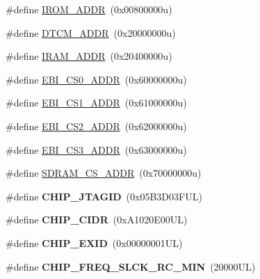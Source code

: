 \begin{DoxyCompactItemize}
\item 
\#define \mbox{\hyperlink{group__SAME70N21__definitions_ga694212ffb8c2786bacee3d0ad6020bda}{I\+R\+O\+M\+\_\+\+A\+D\+DR}}~(0x00800000u)
\item 
\#define \mbox{\hyperlink{group__SAME70N21__definitions_ga26626a425f7ebb3a0c2dbc276f0d9f78}{D\+T\+C\+M\+\_\+\+A\+D\+DR}}~(0x20000000u)
\item 
\#define \mbox{\hyperlink{group__SAME70N21__definitions_gaae45ac2ef16942159481c767ac4805cf}{I\+R\+A\+M\+\_\+\+A\+D\+DR}}~(0x20400000u)
\item 
\#define \mbox{\hyperlink{group__SAME70N21__definitions_ga9bcbb97ddae3b2cc5e2c9613d33f66b4}{E\+B\+I\+\_\+\+C\+S0\+\_\+\+A\+D\+DR}}~(0x60000000u)
\item 
\#define \mbox{\hyperlink{group__SAME70N21__definitions_gaaddd9fdbbc77c9aced5308819f502a26}{E\+B\+I\+\_\+\+C\+S1\+\_\+\+A\+D\+DR}}~(0x61000000u)
\item 
\#define \mbox{\hyperlink{group__SAME70N21__definitions_ga058a35f9991487dc2dd12ada792d0730}{E\+B\+I\+\_\+\+C\+S2\+\_\+\+A\+D\+DR}}~(0x62000000u)
\item 
\#define \mbox{\hyperlink{group__SAME70N21__definitions_gad66ebdd0fc33ec3cf85dbaa14bbf05d9}{E\+B\+I\+\_\+\+C\+S3\+\_\+\+A\+D\+DR}}~(0x63000000u)
\item 
\#define \mbox{\hyperlink{group__SAME70N21__definitions_ga61b7db25daf759c2a2beb6e5a0b57a84}{S\+D\+R\+A\+M\+\_\+\+C\+S\+\_\+\+A\+D\+DR}}~(0x70000000u)
\item 
\mbox{\label{group__SAME70N21__definitions_gaa614519778eec0df55d3eeab3223e3f6}} 
\#define {\bfseries C\+H\+I\+P\+\_\+\+J\+T\+A\+G\+ID}~(0x05\+B3\+D03\+F\+U\+L)
\item 
\mbox{\label{group__SAME70N21__definitions_ga1e1ae44dd9269a8a98c1d7e7a60e9fbd}} 
\#define {\bfseries C\+H\+I\+P\+\_\+\+C\+I\+DR}~(0x\+A1020\+E00\+U\+L)
\item 
\mbox{\label{group__SAME70N21__definitions_ga35123717aa86b76bb6b73cf3adc4c2e6}} 
\#define {\bfseries C\+H\+I\+P\+\_\+\+E\+X\+ID}~(0x00000001\+U\+L)
\item 
\mbox{\label{group__SAME70N21__definitions_ga0e868bf27426399dfdcb3a9dfc3733c4}} 
\#define {\bfseries C\+H\+I\+P\+\_\+\+F\+R\+E\+Q\+\_\+\+S\+L\+C\+K\+\_\+\+R\+C\+\_\+\+M\+IN}~(20000\+U\+L)

\end{DoxyCompactItemize}
